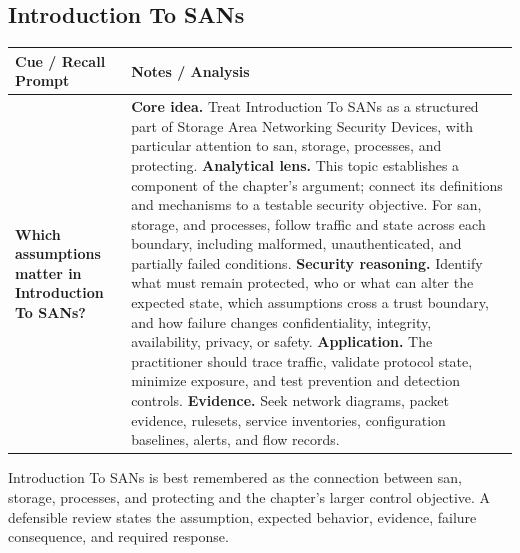 \documentclass[11pt]{article}
\newcommand{\CornellHeader}{%
\rowcolor{Navy}\color{white}\bfseries Cue / Recall Prompt & \color{white}\bfseries Notes / Analysis\\\hline}
\newcommand{\CornellRow}[2]{%
\cellcolor{CueGray}\RaggedRight\textbf{#1} & \RaggedRight #2\\\hline}
\begin{document}
\subsection*{Introduction To SANs}
\begin{longtable}{>{\RaggedRight\arraybackslash}p{}|>{\RaggedRight\arraybackslash}p{}}
\CornellHeader
\CornellRow{Which assumptions matter in Introduction To SANs?}{\textbf{Core idea.} Treat Introduction To SANs as a structured part of Storage Area Networking Security Devices, with particular attention to san, storage, processes, and protecting. \textbf{Analytical lens.} This topic establishes a component of the chapter's argument; connect its definitions and mechanisms to a testable security objective. For san, storage, and processes, follow traffic and state across each boundary, including malformed, unauthenticated, and partially failed conditions. \textbf{Security reasoning.} Identify what must remain protected, who or what can alter the expected state, which assumptions cross a trust boundary, and how failure changes confidentiality, integrity, availability, privacy, or safety. \textbf{Application.} The practitioner should trace traffic, validate protocol state, minimize exposure, and test prevention and detection controls. \textbf{Evidence.} Seek network diagrams, packet evidence, rulesets, service inventories, configuration baselines, alerts, and flow records.}
\end{longtable}
\begin{topicsummary}
Introduction To SANs is best remembered as the connection between san, storage, processes, and protecting and the chapter's larger control objective. A defensible review states the assumption, expected behavior, evidence, failure consequence, and required response.
\end{topicsummary}
\end{document}
